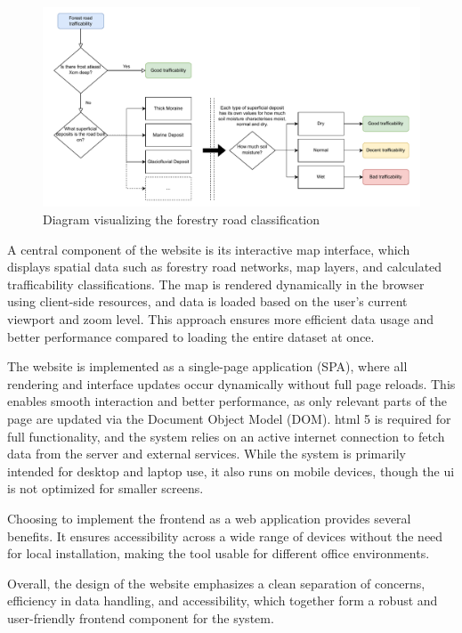 \begin{figure}[h]
    \centering
    \centerline{\includegraphics[width=1.2\linewidth]{figures/roadclassification.pdf}}
    \caption{Diagram visualizing the forestry road classification}
    \label{fig:forestryroadclassification}
\end{figure}

A central component of the website is its interactive map interface, which displays spatial data such as forestry road networks, map layers, and calculated trafficability classifications. The map is rendered dynamically in the browser using client-side resources, and data is loaded based on the user's current viewport and zoom level. This approach ensures more efficient data usage and better performance compared to loading the entire dataset at once.

The website is implemented as a single-page application (SPA), where all rendering and interface updates occur dynamically without full page reloads. This enables smooth interaction and better performance, as only relevant parts of the page are updated via the Document Object Model (DOM). \acrshort{html} 5 is required for full functionality, and the system relies on an active internet connection to fetch data from the server and external services. While the system is primarily intended for desktop and laptop use, it also runs on mobile devices, though the \acrshort{ui} is not optimized for smaller screens.

Choosing to implement the frontend as a web application provides several benefits. It ensures accessibility across a wide range of devices without the need for local installation, making the tool usable for different office environments.

Overall, the design of the website emphasizes a clean separation of concerns, efficiency in data handling, and accessibility, which together form a robust and user-friendly frontend component for the system.

